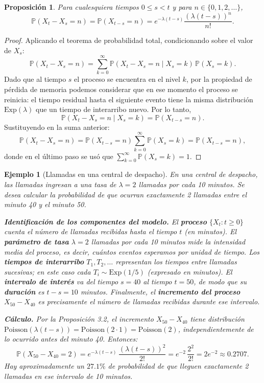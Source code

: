 \documentclass[12pt]{book}
\newtheorem{proposition}{Proposición}[chapter]
\newtheorem{example}{Ejemplo}[chapter]
\begin{document}
\begin{proposition}
Para cualesquiera tiempos $0 \le s < t$ y para $n \in \{0, 1, 2, \ldots\}$,
\[
    \mathbb{P}(X_t - X_s = n) = \mathbb{P}(X_{t-s} = n) = e^{-\lambda(t-s)}\frac{(\lambda(t-s))^n}{n!}.
\]
\end{proposition}

\begin{proof}
Aplicando el teorema de probabilidad total, condicionando sobre el valor de $X_s$:
\[
    \mathbb{P}(X_t - X_s = n) = \sum_{k=0}^{\infty} \mathbb{P}(X_t - X_s = n \mid X_s = k)\,\mathbb{P}(X_s = k).
\]
Dado que al tiempo $s$ el proceso se encuentra en el nivel $k$, por la propiedad de pérdida de memoria podemos considerar que en ese momento el proceso se reinicia: el tiempo residual hasta el siguiente evento tiene la misma distribución $\mathrm{Exp}(\lambda)$ que un tiempo de interarribo nuevo. Por lo tanto,
\[
    \mathbb{P}(X_t - X_s = n \mid X_s = k) = \mathbb{P}(X_{t-s} = n).
\]
Sustituyendo en la suma anterior:
\[
    \mathbb{P}(X_t - X_s = n)
    = \mathbb{P}(X_{t-s} = n)\sum_{k=0}^{\infty}\mathbb{P}(X_s = k)
    = \mathbb{P}(X_{t-s} = n),
\]
donde en el último paso se usó que $\sum_{k=0}^{\infty}\mathbb{P}(X_s = k) = 1$.
\end{proof}

\begin{example}[Llamadas en una central de despacho]
En una central de despacho, las llamadas ingresan a una tasa de $\lambda = 2$ llamadas por cada 10 minutos. Se desea calcular la probabilidad de que ocurran exactamente 2 llamadas entre el minuto 40 y el minuto 50.

\medskip
\textbf{Identificación de los componentes del modelo.} El \textbf{proceso} $\{X_t : t \ge 0\}$ cuenta el número de llamadas recibidas hasta el tiempo $t$ (en minutos). El \textbf{parámetro de tasa} $\lambda = 2$ llamadas por cada 10 minutos mide la intensidad media del proceso, es decir, cuántos eventos esperamos por unidad de tiempo. Los \textbf{tiempos de interarribo} $T_1, T_2, \ldots$ representan los tiempos entre llamadas sucesivas; en este caso cada $T_i \sim \mathrm{Exp}(1/5)$ (expresado en minutos). El \textbf{intervalo de interés} va del tiempo $s = 40$ al tiempo $t = 50$, de modo que su \textbf{duración} es $t - s = 10$ minutos. Finalmente, el \textbf{incremento del proceso} $X_{50} - X_{40}$ es precisamente el número de llamadas recibidas durante ese intervalo.

\medskip
\textbf{Cálculo.} Por la Proposición 3.2, el incremento $X_{50} - X_{40}$ tiene distribución $\mathrm{Poisson}(\lambda(t-s)) = \mathrm{Poisson}(2 \cdot 1) = \mathrm{Poisson}(2)$, independientemente de lo ocurrido antes del minuto 40. Entonces:
\[
    \mathbb{P}(X_{50} - X_{40} = 2)
    = e^{-\lambda(t-s)}\,\frac{(\lambda(t-s))^2}{2!}
    = e^{-2}\,\frac{2^2}{2!}
    = 2e^{-2}
    \approx 0.2707.
\]
Hay aproximadamente un $27.1\%$ de probabilidad de que lleguen exactamente 2 llamadas en ese intervalo de 10 minutos.
\end{example}
\end{document}
